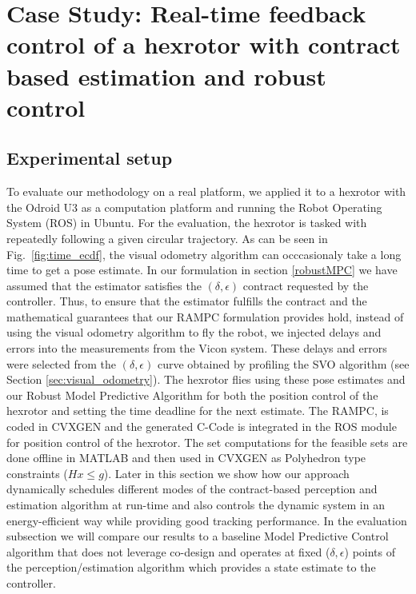 \section{Case Study: Real-time feedback control of a hexrotor with contract based estimation and robust control}
\label{sec:experiments}

\subsection{Experimental setup}
To evaluate our methodology on a real platform, we applied it to a hexrotor with the Odroid U3 as a computation platform and running the Robot Operating System (ROS) in Ubuntu. For the evaluation, the hexrotor is tasked with repeatedly following a given circular trajectory.
As can be seen in Fig.~\ref{fig:time_ecdf}, the visual odometry algorithm can occcasionaly take a long time to get a pose estimate. In our formulation in section \ref{robustMPC} we have assumed that the estimator satisfies the $(\delta, \epsilon)$ contract requested by the controller. Thus, to ensure that the estimator fulfills the contract and the mathematical guarantees that our RAMPC formulation provides hold, instead of using the visual odometry algorithm to fly the robot, we injected delays and errors into the measurements from the Vicon system. These delays and errors were selected from the $(\delta,\epsilon)$ curve obtained by profiling the SVO algorithm (see Section \ref{sec:visual_odometry}).
The hexrotor flies using these pose estimates and our Robust Model Predictive Algorithm for both the position control of the hexrotor and setting the time deadline for the next estimate. The RAMPC, is coded in CVXGEN \cite{} and the generated C-Code is integrated in the ROS module for position control of the hexrotor. The set computations for the feasible sets are done offline in MATLAB and then used in CVXGEN as Polyhedron type constraints ($Hx \le g$). 
Later in this section we show how our approach dynamically schedules different modes of the contract-based perception and estimation algorithm at run-time and also controls the dynamic system in an energy-efficient way while providing good tracking performance. In the evaluation subsection we will compare our results to a baseline Model Predictive Control algorithm that does not leverage co-design and operates at fixed ($\delta,\epsilon$) points of the perception/estimation algorithm which provides a state estimate to the controller.

